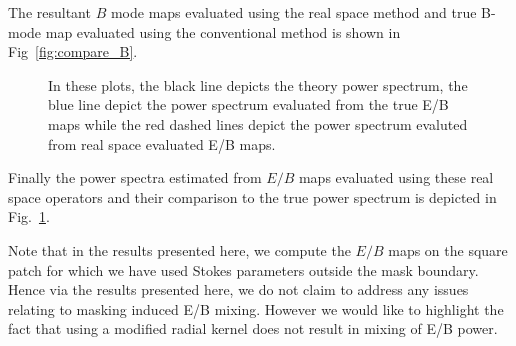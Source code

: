 \documentclass[12pt]{article}
\begin{document}
The resultant $B$ mode maps evaluated using the real space method and true B-mode map evaluated using the conventional method is shown in Fig~\ref{fig:compare_B}. 
%
\begin{figure}[!h]
\centering
{}
\caption{In these plots, the black line depicts the theory power spectrum, the blue line depict the power spectrum evaluated from the true E/B maps while the red dashed lines depict the power spectrum evaluted from real space evaluated E/B maps.}
\label{fig:compare_spectra}
\end{figure}
%
Finally the power spectra estimated from $E/B$ maps evaluated using these real space operators and their comparison to the true power spectrum is depicted in Fig.~\ref{fig:compare_spectra}. 

Note that in the results presented here, we compute the $E/B$ maps on the square patch for which we have used Stokes parameters outside the mask boundary. Hence via the results presented here, we do not claim to address any issues relating to masking induced E/B mixing. However we would like to highlight the fact that using a modified radial kernel does not result in mixing of E/B power.
\end{document}
